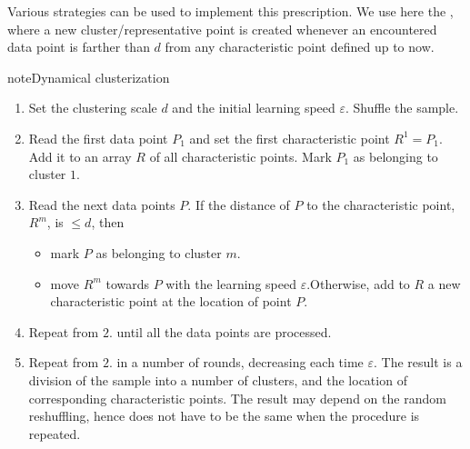 \documentclass[a4paper,12pt,polish]{jupyterBook}
\begin{document}
\sphinxAtStartPar
Various strategies can be used to implement this prescription. We use here the , where a new cluster/representative point is created whenever an encountered data point is farther than \(d\) from any characteristic point defined up to now.

\begin{sphinxadmonition}{note}{Dynamical clusterization}
\begin{enumerate}
%
\item {} 
\sphinxAtStartPar
Set the clustering scale \(d\) and the initial learning speed \(\varepsilon\). Shuffle the sample.

\item {} 
\sphinxAtStartPar
Read the first data point \(P_1\) and set the first characteristic point \(R^1=P_1\). Add it to an array \(R\) of all characteristic points. Mark \(P_1\) as belonging to cluster \(1\).

\item {} 
\sphinxAtStartPar
Read the next data points \(P\). If the distance of \(P\) to the  characteristic point, \(R^m\), is \(\le d\), then
\begin{itemize}
\item {} 
\sphinxAtStartPar
mark \(P\) as belonging to cluster \(m\).

\item {} 
\sphinxAtStartPar
move \(R^m\) towards \(P\) with the learning speed \(\varepsilon\).Otherwise, add to \(R\) a new characteristic point at the location of point \(P\).

\end{itemize}

\item {} 
\sphinxAtStartPar
Repeat from \(2.\) until all the data points are processed.

\item {} 
\sphinxAtStartPar
Repeat from \(2.\) in a number of rounds, decreasing each time \(\varepsilon\). The result is a division of the sample into a number of clusters, and the location of corresponding characteristic points. The result may depend on the random reshuffling, hence does not have to be the same when the procedure is repeated.

\end{enumerate}
\end{sphinxadmonition}
\end{document}
